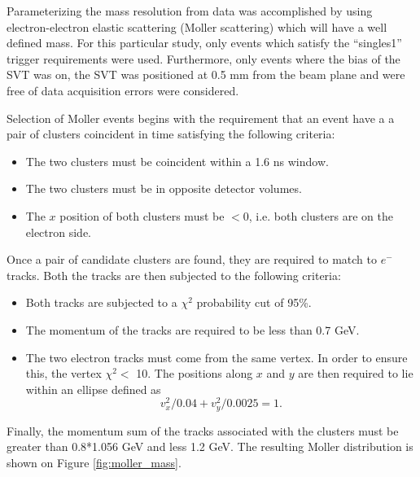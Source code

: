 Parameterizing the mass resolution from data was accomplished by using electron-electron
elastic scattering (Moller scattering) which will have a well defined mass.
For this particular study, only events which satisfy the ``singles1'' trigger 
requirements were used.  Furthermore, only events where the bias of the SVT was 
on, the SVT was positioned at 0.5 mm from the beam plane and were free of 
data acquisition errors were considered.

Selection of Moller events begins with the requirement that an event have a
a pair of clusters coincident in time satisfying the following criteria:
\begin{itemize}
    \item The two clusters must be coincident within a 1.6 ns window.
    \item The two clusters must be in opposite detector volumes.
    \item The $x$ position of both clusters must be $<0$, i.e. both clusters
          are on the electron side.
\end{itemize}
Once a pair of candidate clusters are found, they are required to match to 
$e^-$ tracks.  Both the tracks are then subjected to the following criteria:
\begin{itemize}
    \item Both tracks are subjected to a $\chi^{2}$ probability cut of 95\%.
    \item The momentum of the tracks are required to be less than 0.7 GeV.
    \item The two electron tracks must come from the same vertex.  In order to
          ensure this, the vertex $\chi^2 <$ 10. The positions along $x$ and $y$
          are then required to lie within an ellipse defined as
          \[
                v_x^2/0.04 + v_y^2/0.0025  = 1.
          \]
\end{itemize}
Finally, the momentum sum of the tracks associated with the clusters must be
greater than 0.8*1.056 GeV and less 1.2 GeV.  The resulting Moller distribution
is shown on Figure \ref{fig:moller_mass}. 

